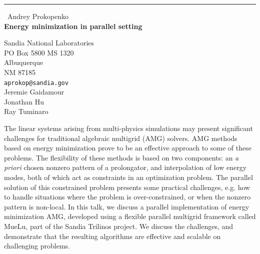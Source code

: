 \documentclass{report}
\begin{document}
\begin{center}
\rule{6in}{1pt} \
{\large Andrey Prokopenko \\
{\bf Energy minimization in parallel setting}}

Sandia National Laboratories \\ PO Box 5800 MS 1320 \\ Albuquerque \\ NM 87185
\\
{\tt aprokop@sandia.gov}\\
Jeremie Gaidamour\\
Jonathan Hu\\
Ray Tuminaro\end{center}

The linear systems arising from multi-physics simulations may present
significant challenges for traditional algebraic multigrid (AMG) solvers.
AMG methods based on energy minimization prove to be an effective
approach to some of these problems. The flexibility of these methods is
based on two components: an {\it a priori} chosen nonzero pattern of a
prolongator, and interpolation of low energy modes, both of which act as
constraints in an optimization problem. The parallel solution of this
constrained problem presents some practical challenges, e.g. how to
handle situations where the problem is over-constrained, or when the
nonzero pattern is non-local. In this talk, we discuss a parallel
implementation of energy minimization AMG, developed using a flexible
parallel multigrid framework called MueLu, part of the Sandia Trilinos
project. We discuss the challenges, and demonstrate that the resulting
algorithms are effective and scalable on challenging problems.
\end{document}
